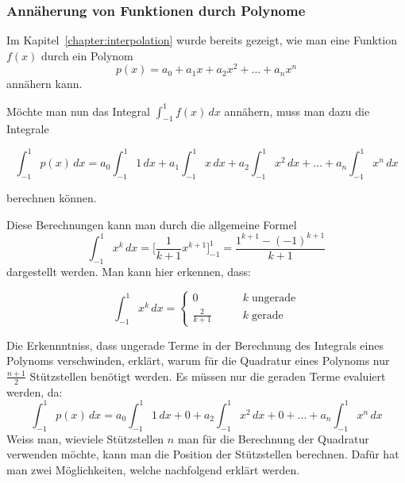 \subsubsection{Annäherung von Funktionen durch Polynome}
Im Kapitel~\ref{chapter:interpolation} wurde bereits gezeigt, 
wie man eine Funktion $f(x)$ durch ein Polynom 
\begin{equation}
    p(x) = a_{0} + a_{1}x + a_{2}x^{2} + ... + a_{n}x^{n}
\end{equation}
\noindent
annähern kann.
\newline

\noindent
Möchte man nun das Integral $\int_{-1}^{1} f(x) \, dx$ annähern, 
muss man dazu die Integrale 

\begin{equation}
    \int_{-1}^{1} p(x)\,dx 
    =
    a_{0} \int_{-1}^{1} 1\,dx
    +
    a_{1}\int_{-1}^{1} x\,dx 
    + 
    a_{2}\int_{-1}^{1} x^{2} \,dx  
    +
    ... 
    +
    a_{n}\int_{-1}^{1} x^{n}\,dx 
\end{equation}

\noindent
berechnen können.
\newline

\noindent
Diese Berechnungen kann man durch die allgemeine Formel
\begin{equation}
    \int_{-1}^{1} x^{k}\,dx 
    = 
    \bigg[\frac{1}{k+1} x^{k+1}\bigg]_{-1}^{1}
    =
    \frac{1^{k+1} - (-1)^{k+1}}{k+1}  
\end{equation}
\noindent
dargestellt werden. Man kann hier erkennen, dass:

\begin{equation}
    \int_{-1}^{1} x^{k}\,dx 
    =
    \begin{cases}
        0&\qquad k \; \text{ungerade}\\
        \frac{2}{k+1}&\qquad k \; \text{gerade}
        \end{cases}  
\end{equation}
\newpage

\noindent
Die Erkennntniss, dass ungerade Terme in der Berechnung 
des Integrals eines Polynoms verschwinden, 
erklärt, warum für die Quadratur eines Polynoms nur $\frac{n+1}{2}$ 
Stützstellen benötigt werden. Es müssen nur die geraden Terme evaluiert werden,
da:
\begin{equation}
    \int_{-1}^{1} p(x)\,dx 
    =
    a_{0} \int_{-1}^{1} 1\,dx
    +
    0
    + 
    a_{2}\int_{-1}^{1} x^{2} \,dx  
    +
    0
    +
    ... 
    +
    a_{n}\int_{-1}^{1} x^{n}\,dx
\end{equation}
\noindent
Weiss man, wieviele Stützstellen $n$ man für die Berechnung der Quadratur verwenden möchte,
kann man die Position der Stützstellen berechnen. 
Dafür hat man zwei Möglichkeiten, welche nachfolgend erklärt werden.

